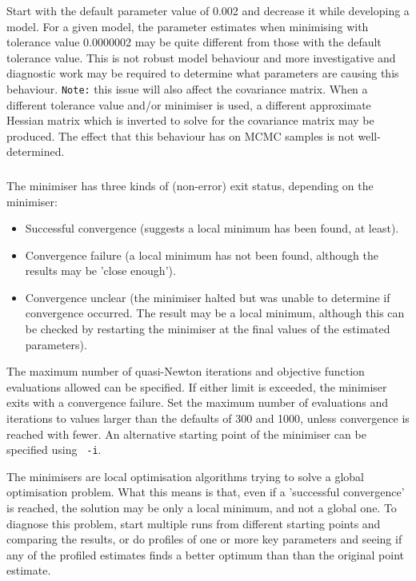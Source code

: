 Start with the default  parameter value of 0.002 and decrease it while developing a model. For a given model, the parameter estimates when minimising with tolerance value 0.0000002 may be quite different from those with the default tolerance value. This is not robust model behaviour and more investigative and diagnostic work may be required to determine what parameters are causing this behaviour. \texttt{Note:} this issue will also affect the covariance matrix. When a different tolerance value and/or minimiser is used, a different approximate Hessian matrix which is inverted to solve for the covariance matrix may be produced. The effect that this behaviour has on MCMC samples is not well-determined.

\subsubsection{}

The minimiser has three kinds of (non-error) exit status, depending on the minimiser:

\begin{itemize}
\item Successful convergence (suggests a local minimum has been found, at least).
\item Convergence failure (a local minimum has not been found, although the results may be 'close enough').
\item Convergence unclear (the minimiser halted but was unable to determine if convergence occurred. The result may be a local minimum, although this can be checked by restarting the minimiser at the final values of the estimated parameters).
\end{itemize}

The maximum number of quasi-Newton iterations and objective function evaluations allowed can be specified. If either limit is exceeded, the minimiser exits with a convergence failure. Set the maximum number of evaluations and iterations to values larger than the defaults of 300 and 1000, unless convergence is reached with fewer. An alternative starting point of the minimiser can be specified using \texttt{\cname\ -i}.

The minimisers are local optimisation algorithms trying to solve a global optimisation problem. What this means is that, even if a 'successful convergence' is reached, the solution may be only a local minimum, and not a global one. To diagnose this problem, start multiple runs from different starting points and comparing the results, or do profiles of one or more key parameters and seeing if any of the profiled estimates finds a better optimum than than the original point estimate.


